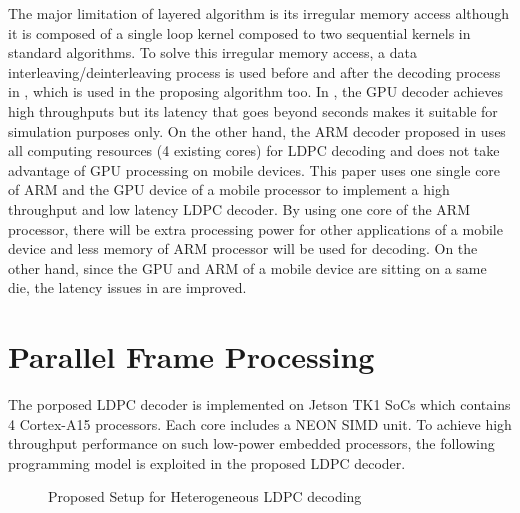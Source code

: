 \documentclass[conference]{IEEEtran}
\begin{document}
The major limitation of layered algorithm is its irregular memory access although it is composed of a single loop kernel composed to two sequential kernels in standard algorithms. To solve this irregular memory access, a data interleaving/deinterleaving process is used before and after the decoding process in \cite{art_gpu_0, art_neon}, which is used in the proposing algorithm too. In \cite{art_gpu_0}, the GPU decoder achieves high throughputs but its latency that goes beyond seconds makes it suitable for simulation purposes only. On the other hand, the ARM decoder proposed in \cite{art_neon} uses all computing resources (4 existing cores) for LDPC decoding and does not take advantage of GPU processing on mobile devices. This paper uses one single core of ARM and the GPU device of a mobile processor to implement a high throughput and low latency LDPC decoder. By using one core of the ARM processor, there will be extra processing power for other applications of a mobile device and less memory of ARM processor will be used for decoding. On the other hand, since the GPU and ARM of a mobile device are sitting on a same die, the latency issues in \cite{art_gpu_0} are improved.

\section{Parallel Frame Processing} \label{sec3}
The porposed LDPC decoder is implemented on Jetson TK1 SoCs which contains 4 Cortex-A15 processors. Each core includes a NEON SIMD unit. To achieve high throughput performance on such low-power embedded processors, the following programming model is exploited in the proposed LDPC decoder.

\begin{figure}[h]
\begin{centering}
\caption[width=.3\textwidth]{Proposed Setup for Heterogeneous LDPC decoding}
\label{fig_porposed_alg}
\end{centering}
\end{figure}
\end{document}
